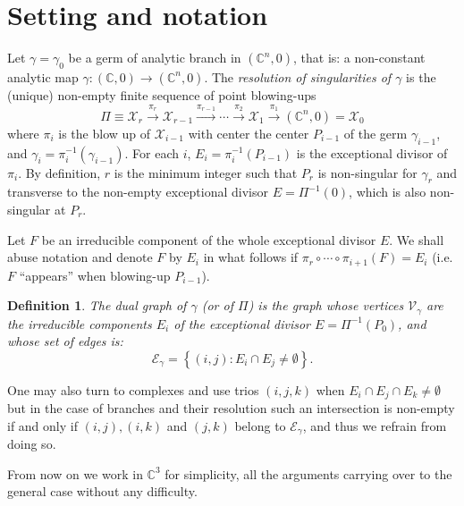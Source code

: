 \documentclass[a4paper,10pt]{amsart}
\newtheorem{definition}{Definition}
\begin{document}
\section{Setting and notation}
Let $\gamma=\gamma_0$ be a germ of analytic branch in $(\mathbb{C}^n,0)$, that is: a non-constant analytic map $\gamma:(\mathbb{C},0)\rightarrow (\mathbb{C}^n,0)$. The \emph{resolution of singularities of $\gamma$} is the (unique) non-empty finite sequence of point blowing-ups
\begin{equation}\label{eq:resolucion-of-gamma}
  \Pi\equiv \mathcal{X}_r \stackrel{\pi_r}{\longrightarrow}\mathcal{X}_{r-1}
  \stackrel{\pi_{r-1}}{\longrightarrow}\cdots\stackrel{\pi_2}{\longrightarrow}
  \mathcal{X}_1\stackrel{\pi_1}{\longrightarrow}(\mathbb{C}^n,0)=\mathcal{X}_{0}
\end{equation}
where $\pi_i$ is the blow up of $\mathcal{X}_{i-1}$ with center the center $P_{i-1}$ of the germ $\gamma_{i-1}$, and $\gamma_i=\pi^{-1}_i(\gamma_{i-1})$. For each $i$, $E_i=\pi_{i}^{-1}(P_{i-1})$ is the exceptional divisor of $\pi_i$. By definition, $r$ is the minimum integer such that $P_r$ is non-singular for $\gamma_r$ and transverse to the non-empty exceptional divisor $E=\Pi^{-1}(0)$, which is also non-singular at $P_r$.

Let $F$ be an irreducible component of the whole exceptional divisor $E$. We shall abuse notation and denote $F$ by $E_i$ in what follows if $\pi_{r}\circ\cdots\circ \pi_{i+1}(F)=E_i$ (i.e. $F$ ``appears'' when blowing-up $P_{i-1}$).

\begin{definition}\label{def:dual-graph}
  The \emph{dual graph} of $\gamma$ (or of $\Pi$) is the graph whose vertices $\mathcal{V}_{\gamma}$ are the irreducible components $E_i$ of the exceptional divisor $E=\Pi^{-1}(P_{0})$, and whose set of edges is:
  \begin{equation*}
    \mathcal{E}_{\gamma} = \left\{ (i,j) : E_i\cap E_j\neq \emptyset \right\}.
  \end{equation*}
\end{definition}

One may also turn to complexes and use trios $(i,j,k)$ when $E_i\cap E_j\cap E_k\neq \emptyset$ but in the case of branches and their resolution such an intersection is non-empty  if and only if $(i,j), (i,k)$ and $(j,k)$ belong to $\mathcal{E}_{\gamma}$, and thus we refrain from doing so.

From now on we work in $\mathbb{C}^{3}$ for simplicity, all the arguments carrying over to the general case without any difficulty.
\end{document}
